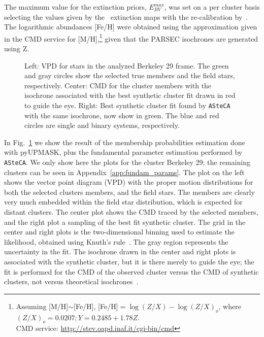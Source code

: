 \documentclass{aa}
\begin{document}
  \noindent The maximum value for the extinction priors, $E_{BV}^{max}$, was set
  on a per cluster basis selecting the values given by the~\cite{Schlegel_1998}
  extinction maps with the re-calibration by~\cite{Schlafly_2011}.
  The logarithmic abundances [Fe/H] were obtained using the approximation given
  in the CMD service for [M/H],\footnote{Assuming [M/H]$\sim$[Fe/H], [Fe/H]$=\log(Z/X)-\log(Z/X)_{o}$, where
  $(Z/X)_{o}=0.0207; Y=0.2485+1.78Z$.\\
  CMD service: \url{http://stev.oapd.inaf.it/cgi-bin/cmd}} given that the
  PARSEC isochrones are generated using Z.

  \begin{figure}
   \caption{Left: VPD for stars in the analyzed Berkeley 29
    frame. The green and gray circles show the selected true members and the field
    stars, respectively.
    Center: CMD for the cluster members with the isochrone associated with the
    best synthetic cluster fit drawn in red to guide the eye.
    Right: Best synthetic cluster fit found by \texttt{ASteCA} with the same
    isochrone, now show in green. The blue and red circles are single and binary
    systems, respectively.}
   \label{fig:BER29_fpars}
  \end{figure}

  In Fig.~\ref{fig:BER29_fpars} we show the result of the membership
  probabilities estimation done with pyUPMASK, plus the fundamental parameter
  estimation performed by \texttt{ASteCA}. We only show here the plots for
  the cluster Berkeley 29; the remaining clusters can be seen in
  Appendix~\ref{app:fundam_params}.
  The plot on the left shows the vector point diagram (VPD) with the proper
  motion distributions for both the selected clusters members, and the field
  stars. The members are clearly very much embedded within the field star
  distribution, which is expected for distant clusters. The center plot shows
  the CMD traced by the selected members, and the right plot a sampling of the
  best fit synthetic cluster. The grid in the center and right plots is
  the  two-dimensional binning used to estimate the likelihood, obtained using
  Knuth's rule~\citep{Knuth_2006}. The gray region represents the uncertainty
  in the fit. The isochrone drawn in the center and right plots is associated
  with the synthetic cluster, but it is there merely to guide the eye; the fit is
  performed for the CMD of the observed cluster versus the CMD of synthetic
  clusters, not versus theoretical isochrones~\citep[this is further
  explained in][]{Perren_2015,Perren_2017,Perren_2020}.\\
\end{document}
